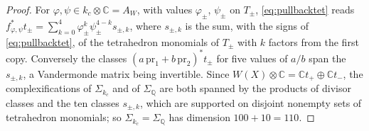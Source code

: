 \documentclass[11pt,reqno]{amsart}
\theoremstyle{plain}
\theoremstyle{definition}
\theoremstyle{remark}
\newcommand{\QQ}{\mathbb{Q}}
\newcommand{\CC}{\mathbb{C}}
\newcommand{\HW}{W}                      %
\begin{document}
\begin{proof}
For $\varphi,\psi\in k_{c}\otimes\CC=A_{W}$, with values $\varphi_{\pm}$,
$\psi_{\pm}$ on $T_{\pm}$, \eqref{eq:pullbacktet} reads
$f_{\varphi,\psi}^{*}t_{\pm}=\sum_{k=0}^{4}\varphi_{\pm}^{k}\psi_{\pm}^{4-k}
s_{\pm,k}$, where $s_{\pm,k}$ is the sum, with the signs of
\eqref{eq:pullbacktet}, of the tetrahedron monomials of $T_{\pm}$ with $k$
factors from the first copy. Conversely the classes
$(a\,\mathrm{pr}_{1}+b\,\mathrm{pr}_{2})^{*}t_{\pm}$ for five values of $a/b$
span the $s_{\pm,k}$, a Vandermonde matrix being invertible. Since
$\HW(X)\otimes\CC=\CC t_{+}\oplus\CC t_{-}$, the complexifications of
$\Sigma_{k_{c}}$ and of $\Sigma_{\QQ}$ are both spanned by the products of
divisor classes and the ten classes $s_{\pm,k}$, which are supported on
disjoint nonempty sets of tetrahedron monomials; so
$\Sigma_{k_{c}}=\Sigma_{\QQ}$ has dimension $100+10=110$.


\end{proof}
\end{document}
